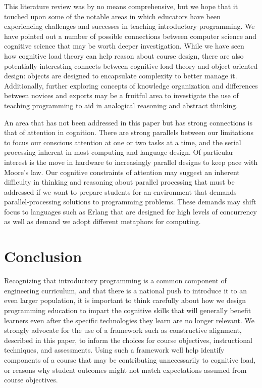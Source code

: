 \documentclass[12pt]{article}
\begin{document}
This literature review was by no means comprehensive, but we hope that
it touched upon some of the notable areas in which educators have been
experiencing challenges and successes in teaching introductory
programming. We have pointed out a number of possible connections
between computer science and cognitive science that may be worth
deeper investigation. While we have seen how cognitive load theory can
help reason about course design, there are also potentially
interesting connects between cognitive load theory and object oriented
design: objects are designed to encapsulate complexity to better
manage it. Additionally, further exploring concepts of knowledge
organization and differences between novices and exports may be a
fruitful area to investigate the use of teaching programming to aid in
analogical reasoning and abstract
thinking\autocite{bennedssen_abstraction_2008}.

An area that has not been addressed in this paper but has strong
connections is that of attention in
cognition\autocite{simon_role_1986}. There are strong parallels
between our limitations to focus our conscious attention at one or two
tasks at a time, and the serial processing inherent in most computing
and language design. Of particular interest is the move in hardware to
increasingly parallel designs to keep pace with Moore's law. Our
cognitive constraints of attention may suggest an inherent difficulty
in thinking and reasoning about parallel processing that must be
addressed if we want to prepare students for an environment that
demands parallel-processing solutions to programming problems. These
demands may shift focus to languages such as Erlang that are designed
for high levels of concurrency as well as demand we adopt different
metaphors for computing\autocite{stein_challenging_1999}.

\section{Conclusion}

Recognizing that introductory programming is a common component of
engineering curriculum, and that there is a national push to introduce
it to an even larger population, it is important to think carefully
about how we design programming education to impart the cognitive
skills that will generally benefit learners even after the specific
technologies they learn are no longer relevant. We strongly advocate
for the use of a framework such as constructive alignment, described in
this paper, to inform the choices for course objectives, instructional
techniques, and assessments. Using such a framework well help identify
components of a course that may be contributing unnecessarily to
cognitive load, or reasons why student outcomes might not match
expectations assumed from course objectives.
\end{document}
